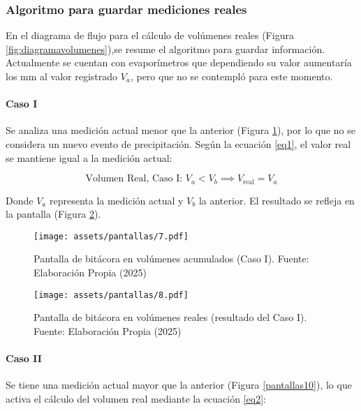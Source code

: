\newpage
\subsubsection*{Algoritmo para guardar mediciones reales}

En el diagrama de flujo para el cálculo de volúmenes reales (Figura \ref{fig:diagramavolumenes}),se resume el algoritmo para guardar información. Actualmente se cuentan con evaporímetros que dependiendo su valor aumentaría los mm al valor registrado $V_a$, pero que no se contempló para este momento.

\paragraph{Caso I}

Se analiza una medición actual menor que la anterior (Figura \ref{pantallas7}), por lo que no se considera un nuevo evento de precipitación. Según la ecuación \ref{eq1}, el valor real se mantiene igual a la medición actual:

\begin{equation}
\text{Volumen Real, Caso I: } V_{a} < V_{b} \implies V_{\text{real}} = V_{a}
\label{eq1}
\end{equation}

Donde $V_{a}$ representa la medición actual y $V_{b}$ la anterior. El resultado se refleja en la pantalla (Figura \ref{pantallas8}).

\begin{figure}[h!]
\centering
\texttt{[image: assets/pantallas/7.pdf]}
\caption{Pantalla de bitácora en volúmenes acumulados (Caso I). Fuente: Elaboración Propia (2025)}
\label{pantallas7}
\end{figure}

\begin{figure}[h!]
\centering
\texttt{[image: assets/pantallas/8.pdf]}
\caption{Pantalla de bitácora en volúmenes reales (resultado del Caso I). Fuente: Elaboración Propia (2025)}
\label{pantallas8}
\end{figure}

\paragraph{Caso II}

Se tiene una medición actual mayor que la anterior (Figura \ref{pantallas10}), lo que activa el cálculo del volumen real mediante la ecuación \ref{eq2}:

